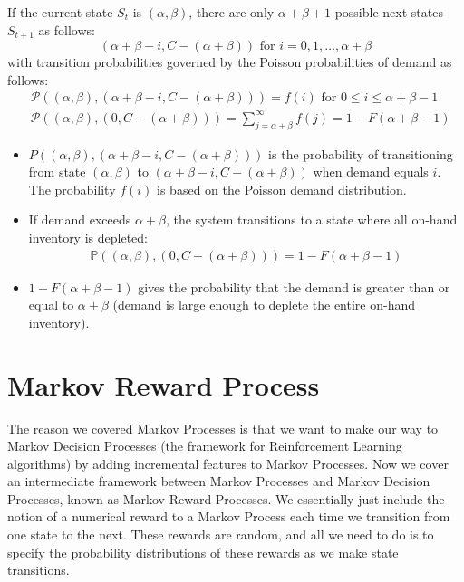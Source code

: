 If the current state $S_t$ is $(\alpha, \beta)$, there are only $\alpha + \beta + 1$ possible next states $S_{t+1}$ as follows\footnotemark:
$$(\alpha + \beta - i, C - (\alpha + \beta)) \text{ for } i =0, 1, \ldots, \alpha + \beta$$
with transition probabilities governed by the Poisson probabilities of demand as follows:
\begin{align*}
	&\mathcal{P}((\alpha, \beta), (\alpha + \beta - i, C - (\alpha + \beta))) = f(i)\text{ for } 0 \leq i \leq \alpha + \beta - 1\\
	&\mathcal{P}((\alpha, \beta), (0, C - (\alpha + \beta))) = \sum_{j=\alpha+\beta}^{\infty} f(j) = 1 - F(\alpha + \beta - 1)
\end{align*}
\begin{itemize}
	\item $P((\alpha, \beta), (\alpha + \beta - i, C - (\alpha + \beta)))$ is the probability of transitioning from state $(\alpha, \beta)$ to $(\alpha + \beta - i, C - (\alpha + \beta))$ when demand equals $i$. The probability $f(i)$ is based on the Poisson demand distribution.
	\item If demand exceeds $\alpha + \beta$, the system transitions to a state where all on-hand inventory is depleted:
		\begin{align*}
			\mathbb{P}((\alpha, \beta), (0, C - (\alpha + \beta))) = 1 - F(\alpha + \beta - 1)
		\end{align*}
	\item $1 - F(\alpha + \beta - 1)$ gives the probability that the demand is greater than or equal to $\alpha+\beta$ (\ie demand is large enough to deplete the entire on-hand inventory).
\end{itemize}


\section{Markov Reward Process}
The reason we covered Markov Processes is that we want to make our way to Markov Decision Processes (the framework for Reinforcement Learning algorithms) by adding incremental features to Markov Processes. Now we cover an intermediate framework between Markov Processes and Markov Decision Processes, known as Markov Reward Processes. We essentially just include the notion of a numerical reward to a Markov Process each time we transition from one state to the next. These rewards are random, and all we need to do is to specify the probability distributions of these rewards as we make state transitions.

